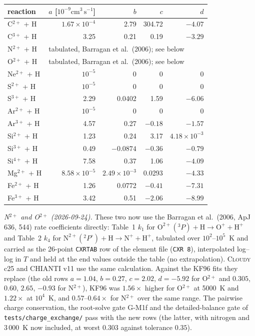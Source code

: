 \documentclass[english,a4paper]{my_memo}
\newcommand{\code}[1]{\texttt{#1}}
\newcommand{\cmc}{\mathrm{cm^{3}\,s^{-1}}}
\begin{document}
\begin{center}\small
\begin{tabular}{lrrrr}
\toprule
reaction & $a$ [$10^{-9}\cmc$] & $b$ & $c$ & $d$ \\
\midrule
C$^{2+}$ + H  & $1.67{\times}10^{-4}$ & 2.79 & 304.72 & $-4.07$ \\
C$^{3+}$ + H  & 3.25 & 0.21 & 0.19 & $-3.29$ \\
N$^{2+}$ + H  & \multicolumn{4}{l}{tabulated, Barragan et al.\ (2006); see below} \\
O$^{2+}$ + H  & \multicolumn{4}{l}{tabulated, Barragan et al.\ (2006); see below} \\
Ne$^{2+}$ + H & $10^{-5}$ & 0 & 0 & 0 \\
S$^{2+}$ + H  & $10^{-5}$ & 0 & 0 & 0 \\
S$^{3+}$ + H  & 2.29 & 0.0402 & 1.59 & $-6.06$ \\
Ar$^{2+}$ + H & $10^{-5}$ & 0 & 0 & 0 \\
Ar$^{3+}$ + H & 4.57 & 0.27 & $-0.18$ & $-1.57$ \\
Si$^{2+}$ + H & 1.23 & 0.24 & 3.17 & $4.18{\times}10^{-3}$ \\
Si$^{3+}$ + H & 0.49 & $-0.0874$ & $-0.36$ & $-0.79$ \\
Si$^{4+}$ + H & 7.58 & 0.37 & 1.06 & $-4.09$ \\
Mg$^{2+}$ + H & $8.58{\times}10^{-5}$ & $2.49{\times}10^{-3}$ & 0.0293 & $-4.33$ \\
Fe$^{2+}$ + H & 1.26 & 0.0772 & $-0.41$ & $-7.31$ \\
Fe$^{3+}$ + H & 3.42 & 0.51 & $-2.06$ & $-8.99$ \\
\bottomrule
\end{tabular}
\end{center}
\emph{N$^{2+}$ and O$^{2+}$ (2026-09-24).}  These two now use the
Barragan et al.\ (2006, ApJ 636, 544) rate coefficients directly: Table~1
$k_1$ for $\mathrm{O}^{2+}(^3P) + \mathrm{H} \to \mathrm{O}^+ + \mathrm{H}^+$
and Table~2 $k_4$ for $\mathrm{N}^{2+}(^2P^\circ) + \mathrm{H} \to
\mathrm{N}^+ + \mathrm{H}^+$, tabulated over $10^2$--$10^5$~K and carried
as the 26-point \code{CXRTAB} row of the element file (\code{CXR 8}),
interpolated log--log in $T$ and held at the end values outside the table
(no extrapolation).  \textsc{Cloudy} c25 and CHIANTI v11 use the same
calculation.  Against the KF96 fits they replace (the old rows
$a = 1.04$, $b = 0.27$, $c = 2.02$, $d = -5.92$ for O$^{2+}$ and $0.305$,
$0.60$, $2.65$, $-0.93$ for N$^{2+}$), KF96 was $1.56\times$ higher for
O$^{2+}$ at 5000~K and $1.22\times$ at $10^4$~K, and $0.57$--$0.64\times$
for N$^{2+}$ over the same range.  The pairwise charge conservation, the
root-solve gate G-M1f and the detailed-balance gate of
\code{tests/charge\_exchange/} pass with the new rows (the latter, with
nitrogen and 3\,000~K now included, at worst $0.303$ against tolerance
$0.35$).
\end{document}
